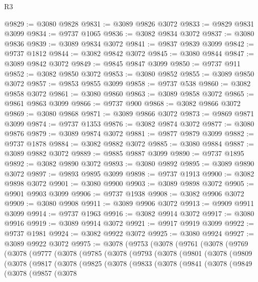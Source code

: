 \begin{lexlean}{R3}
\begin{coremodule}
@9829 := @3080 @9828
@9831 := @3089 @9826 @3072
@9833 := @9829 @9831 @3099
@9834 := @9737 @1065
@9836 := @3082 @9834 @3072
@9837 := @3080 @9836
@9839 := @3089 @9834 @3072
@9841 := @9837 @9839 @3099
@9842 := @9737 @1812
@9844 := @3082 @9842 @3072
@9845 := @3080 @9844
@9847 := @3089 @9842 @3072
@9849 := @9845 @9847 @3099
@9850 := @9737 @911
@9852 := @3082 @9850 @3072
@9853 := @3080 @9852
@9855 := @3089 @9850 @3072
@9857 := @9853 @9855 @3099
@9858 := @9737 @538
@9860 := @3082 @9858 @3072
@9861 := @3080 @9860
@9863 := @3089 @9858 @3072
@9865 := @9861 @9863 @3099
@9866 := @9737 @900
@9868 := @3082 @9866 @3072
@9869 := @3080 @9868
@9871 := @3089 @9866 @3072
@9873 := @9869 @9871 @3099
@9874 := @9737 @1353
@9876 := @3082 @9874 @3072
@9877 := @3080 @9876
@9879 := @3089 @9874 @3072
@9881 := @9877 @9879 @3099
@9882 := @9737 @1878
@9884 := @3082 @9882 @3072
@9885 := @3080 @9884
@9887 := @3089 @9882 @3072
@9889 := @9885 @9887 @3099
@9890 := @9737 @1895
@9892 := @3082 @9890 @3072
@9893 := @3080 @9892
@9895 := @3089 @9890 @3072
@9897 := @9893 @9895 @3099
@9898 := @9737 @1913
@9900 := @3082 @9898 @3072
@9901 := @3080 @9900
@9903 := @3089 @9898 @3072
@9905 := @9901 @9903 @3099
@9906 := @9737 @1938
@9908 := @3082 @9906 @3072
@9909 := @3080 @9908
@9911 := @3089 @9906 @3072
@9913 := @9909 @9911 @3099
@9914 := @9737 @1963
@9916 := @3082 @9914 @3072
@9917 := @3080 @9916
@9919 := @3089 @9914 @3072
@9921 := @9917 @9919 @3099
@9922 := @9737 @1981
@9924 := @3082 @9922 @3072
@9925 := @3080 @9924
@9927 := @3089 @9922 @3072
@9975 := @3078
    (@9753
      (@3078
        (@9761
          (@3078
            (@9769
              (@3078
                (@9777
                  (@3078
                    (@9785
                      (@3078
                        (@9793
                          (@3078
                            (@9801
                              (@3078
                                (@9809
                                  (@3078
                                    (@9817
                                      (@3078
                                        (@9825
                                          (@3078
                                            (@9833
                                              (@3078
                                                (@9841
                                                  (@3078
                                                    (@9849
                                                      (@3078
                                                        (@9857
                                                          (@3078

\end{coremodule}
\end{lexlean}
